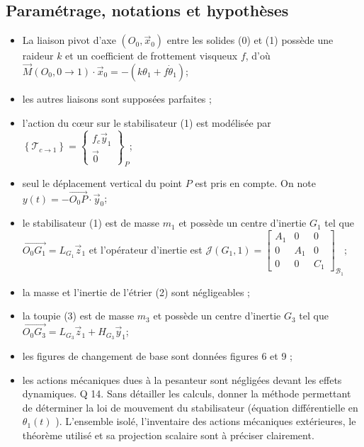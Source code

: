 \subsection*{Paramétrage, notations et hypothèses}
\begin{itemize}
  \item La liaison pivot d'axe $\left(O_{0}, \vec{x}_{0}\right)$ entre les solides (0) et (1) possède une raideur $k$ et un coefficient de frottement visqueux $f$, d'où $\vec{M}\left(O_{0}, 0 \rightarrow 1\right) \cdot \vec{x}_{0}=-\left(k \theta_{1}+f \dot{\theta}_{1}\right)$;

  \item les autres liaisons sont supposées parfaites ;

  \item l'action du cœur sur le stabilisateur (1) est modélisée par $\left\{\mathcal{T}_{c \rightarrow 1}\right\}=\left\{\begin{array}{c}f_{c} \vec{y}_{1} \\ \overrightarrow{0}\end{array}\right\}_{P}$;

\item seul le déplacement vertical du point $P$ est pris en compte. On note $y(t)=-\overrightarrow{O_{0} P} \cdot \vec{y}_{0}$;

\item  le stabilisateur (1) est de masse $m_{1}$ et possède un centre d'inertie $G_{1}$ tel que $\overrightarrow{O_{0} G_{1}}=L_{G_{1}} \vec{z}_{1}$ et l'opérateur d'inertie est $\mathcal{J}\left(G_{1}, 1\right)=\left[\begin{array}{ccc}A_{1} & 0 & 0 \\ 0 & A_{1} & 0 \\ 0 & 0 & C_{1}\end{array}\right]_{\mathcal{B}_{1}} ;$

  \item la masse et l'inertie de l'étrier (2) sont négligeables ;

  \item la toupie (3) est de masse $m_{3}$ et possède un centre d'inertie $G_{3}$ tel que $\overrightarrow{O_{0} G_{3}}=L_{G_{3}} \vec{z}_{1}+H_{G_{3}} \vec{y}_{1}$;

  \item les figures de changement de base sont données figures 6 et 9 ;

  \item les actions mécaniques dues à la pesanteur sont négligées devant les effets dynamiques. Q 14. Sans détailler les calculs, donner la méthode permettant de déterminer la loi de mouvement du stabilisateur (équation différentielle en $\theta_{1}(t)$ ). L'ensemble isolé, l'inventaire des actions mécaniques extérieures, le théorème utilisé et sa projection scalaire sont à préciser clairement.

\end{itemize}

